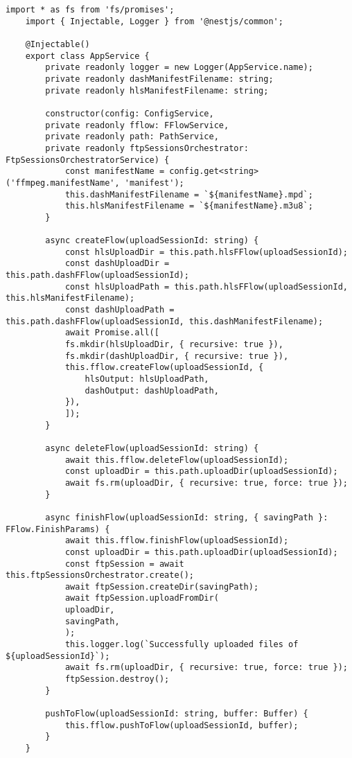 \begin{lstlisting}[caption={app.service.ts}]
	import * as fs from 'fs/promises';
	import { Injectable, Logger } from '@nestjs/common';
	
	@Injectable()
	export class AppService {
		private readonly logger = new Logger(AppService.name);
		private readonly dashManifestFilename: string;
		private readonly hlsManifestFilename: string;
		
		constructor(config: ConfigService,
		private readonly fflow: FFlowService,
		private readonly path: PathService,
		private readonly ftpSessionsOrchestrator: FtpSessionsOrchestratorService) {
			const manifestName = config.get<string>('ffmpeg.manifestName', 'manifest');
			this.dashManifestFilename = `${manifestName}.mpd`;
			this.hlsManifestFilename = `${manifestName}.m3u8`;
		}
		
		async createFlow(uploadSessionId: string) {
			const hlsUploadDir = this.path.hlsFFlow(uploadSessionId);
			const dashUploadDir = this.path.dashFFlow(uploadSessionId);
			const hlsUploadPath = this.path.hlsFFlow(uploadSessionId, this.hlsManifestFilename);
			const dashUploadPath = this.path.dashFFlow(uploadSessionId, this.dashManifestFilename);
			await Promise.all([
			fs.mkdir(hlsUploadDir, { recursive: true }),
			fs.mkdir(dashUploadDir, { recursive: true }),
			this.fflow.createFlow(uploadSessionId, {
				hlsOutput: hlsUploadPath,
				dashOutput: dashUploadPath,
			}),
			]);
		}
		
		async deleteFlow(uploadSessionId: string) {
			await this.fflow.deleteFlow(uploadSessionId);
			const uploadDir = this.path.uploadDir(uploadSessionId);
			await fs.rm(uploadDir, { recursive: true, force: true });
		}
		
		async finishFlow(uploadSessionId: string, { savingPath }: FFlow.FinishParams) {
			await this.fflow.finishFlow(uploadSessionId);
			const uploadDir = this.path.uploadDir(uploadSessionId);
			const ftpSession = await this.ftpSessionsOrchestrator.create();
			await ftpSession.createDir(savingPath);
			await ftpSession.uploadFromDir(
			uploadDir,
			savingPath,
			);
			this.logger.log(`Successfully uploaded files of ${uploadSessionId}`);
			await fs.rm(uploadDir, { recursive: true, force: true });
			ftpSession.destroy();
		}
		
		pushToFlow(uploadSessionId: string, buffer: Buffer) {
			this.fflow.pushToFlow(uploadSessionId, buffer);
		}
	}
\end{lstlisting}

